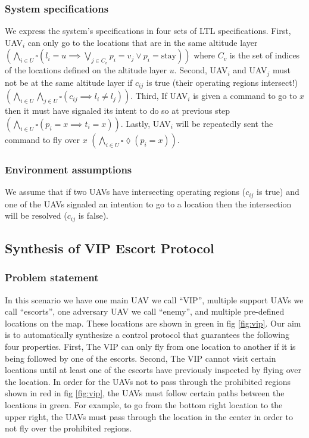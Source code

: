 \documentclass[]{article}
\begin{document}
\subsubsection{System specifications}\label{system-specifications}

We express the system's specifications in four sets of LTL specifications. 
First, UAV$_{i}$ can only go to the locations that are in the same altitude layer $(\bigwedge\limits_{i \in U} \square (l_{i} = 
u \implies \bigvee\limits_{j\in C_{v}} p_{i} = v_{j} \lor p_{i} = \text{stay}))$ where $C_{v}$ is the set of indices of the
locations defined on the altitude layer $u$. Second, UAV$_{i}$ and UAV$_{j}$ must not 
be at the same altitude layer if $c_{ij}$ is true (their operating regions intersect!) 
$(\bigwedge\limits_{i\in U} \bigwedge\limits_{j\in U} \square (c_{ij} \implies l_{i} \neq l_{j}))$. Third, If UAV$_{i}$ is given a command to go 
to $x$ then it must have signaled its intent to do so at previous step 
$(\bigwedge\limits_{i \in U} \square (p_{i} = x \implies t_{i} = x))$. Lastly, UAV$_{i}$ will be repeatedly sent the command to fly over $x$ $(\bigwedge\limits_{i \in U} \square \lozenge (p_{i} = x))$.

\subsubsection{Environment assumptions}\label{environment-assumptions}


We assume that if two UAVs have intersecting operating regions ($c_{ij}$ is true) and 
one of the UAVs signaled an intention to go to a location then the intersection 
will be resolved ($c_{ij}$ is false).

\subsection{Synthesis of VIP Escort Protocol}\label{vip-escort}

\subsubsection{Problem statement}\label{problem-statement}

In this scenario we have one main UAV we call ``VIP'', multiple support UAVs we
call ``escorts'', one adversary UAV we call ``enemy'', and multiple pre-defined 
locations on the map. These locations are shown in green in fig \ref{fig:vip}. 
Our aim is to automatically synthesize 
a control protocol that guarantees the following four properties. First, The 
VIP can only fly from one location to another if it is being followed by one of the escorts. Second, The VIP cannot visit certain locations until at least one 
of the escorts have previously inspected by flying over the location. In order 
for the UAVs not to pass through the prohibited regions shown in red in fig
\ref{fig:vip}, the UAVs must follow certain paths between the locations in green.
For example, to go from the bottom right location to the upper right, the UAVs
must pass through the location in the center in order to not fly over the prohibited regions.
\end{document}
